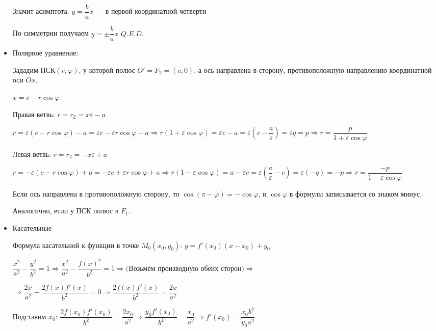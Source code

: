 \documentclass[twoside]{book}
\begin{document}
\begin{itemize}
          Значит асимптота: \(y = \dfrac{b}{a} x\) --- в первой координатной четверти

          По симметрии получаем \(y = \pm \dfrac{b}{a} x\) \(Q.E.D.\)

    \item Полярное уравнение:

          Зададим ПСК\((r, \varphi)\), у которой полюс \(O'= F_2 = (c, 0)\), а ось направлена в сторону, противоположную направлению координатной оси \(Ox\).

          \(x = c - r \cos \varphi\)

          Правая ветвь: \(r = r_2 = x \varepsilon - a\)

          \(r = \varepsilon(c - r \cos \varphi) - a = \varepsilon c - \varepsilon r \cos \varphi - a \Rightarrow r(1 + \varepsilon \cos \varphi) = \varepsilon c - a = \varepsilon \left(c - \dfrac{a}{\varepsilon}\right) = \varepsilon q = p \Rightarrow r = \dfrac{p}{1 + \varepsilon \cos \varphi}\)

          Левая ветвь: \(r = r_2 = - x \varepsilon + a\)

          \(r = - \varepsilon(c - r \cos \varphi) + a = - \varepsilon c + \varepsilon r \cos \varphi + a \Rightarrow r(1 - \varepsilon \cos \varphi) = a - \varepsilon c = \varepsilon \left(\dfrac{a}{\varepsilon} - c\right) = \varepsilon \left(-q \right) = -p \Rightarrow r = \dfrac{-p}{1 - \varepsilon \cos \varphi}\)

          Если ось направлена в противоположную сторону, то \(\cos(\pi - \varphi) = - \cos \varphi\), и \(\cos \varphi\) в формулы записывается со знаком минус.

          Аналогично, если у ПСК полюс в \(F_1\).

    \item Касательные

          Формула касательной к функции в точке \(M_0(x_0, y_0)\): \(y = f'(x_0)(x - x_0) + y_0\)

          \(\dfrac{x^2}{a^2} - \dfrac{y^2}{b^2} = 1 \Rightarrow \dfrac{x^2}{a^2} - \dfrac{f(x)^2}{b^2} = 1 \Rightarrow (\)Возьмём производную обеих сторон\() \Rightarrow\)

          \(\Rightarrow \dfrac{2x}{a^2} - \dfrac{2 f(x) f'(x)}{b^2} = 0 \Rightarrow \dfrac{2 f(x) f'(x)}{b^2} = \dfrac{2x}{a^2}\)

          Подставим \(x_0\): \(\dfrac{2 f(x_0) f'(x_0)}{b^2} = \dfrac{2x_0}{a^2} \Rightarrow \dfrac{y_0 f'(x_0)}{b^2} = \dfrac{x_0}{a^2} \Rightarrow f'(x_0) = \dfrac{x_0 b^2}{y_0 a^2}\)


\end{itemize}
\end{document}
